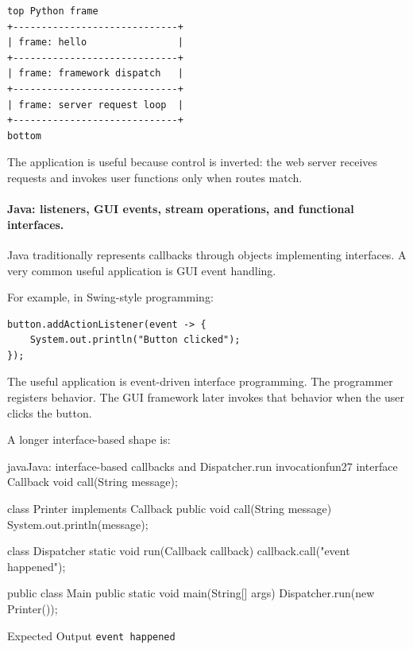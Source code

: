 \documentclass[a4paper,twoside]{report}
\begin{document}
\begin{verbatim}
top Python frame
+-----------------------------+
| frame: hello                |
+-----------------------------+
| frame: framework dispatch   |
+-----------------------------+
| frame: server request loop  |
+-----------------------------+
bottom
\end{verbatim}

The application is useful because control is inverted: the web server receives requests and invokes user functions only when routes match.

\paragraph{Java: listeners, GUI events, stream operations, and functional interfaces.}

Java traditionally represents callbacks through objects implementing interfaces. A very common useful application is GUI event handling.

For example, in Swing-style programming:

\begin{verbatim}
button.addActionListener(event -> {
    System.out.println("Button clicked");
});
\end{verbatim}

The useful application is event-driven interface programming. The programmer registers behavior. The GUI framework later invokes that behavior when the user clicks the button.

A longer interface-based shape is:

\begin{codebox}[]{java}{Java: interface-based callbacks and Dispatcher.run invocation}{fun27}
interface Callback {
    void call(String message);
}

class Printer implements Callback {
    public void call(String message) {
        System.out.println(message);
    }
}

class Dispatcher {
    static void run(Callback callback) {
        callback.call("event happened");
    }
}

public class Main {
    public static void main(String[] args) {
        Dispatcher.run(new Printer());
    }
}
\end{codebox}


\begin{iobox}{Expected Output}
\texttt{event happened} \\
\end{iobox}
\end{document}
